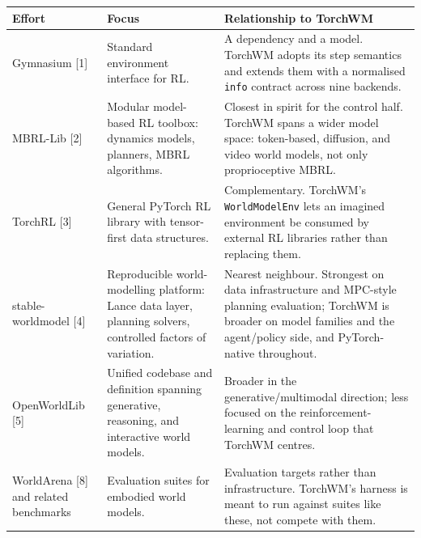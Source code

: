 \documentclass[10pt,a4paper]{article}
\begin{document}
{\footnotesize
\begin{tabular}{@{}p{}p{}p{}@{}}
\toprule
\textbf{Effort} & \textbf{Focus} & \textbf{Relationship to TorchWM}\\
\midrule
Gymnasium [1] & Standard environment interface for RL. & A dependency and a model. TorchWM adopts its step semantics and extends them with a normalised \texttt{info} contract across nine backends.\\[1.4mm]
MBRL-Lib [2] & Modular model-based RL toolbox: dynamics models, planners, MBRL algorithms. & Closest in spirit for the control half. TorchWM spans a wider model space: token-based, diffusion, and video world models, not only proprioceptive MBRL.\\[1.4mm]
TorchRL [3] & General PyTorch RL library with tensor-first data structures. & Complementary. TorchWM's \texttt{WorldModelEnv} lets an imagined environment be consumed by external RL libraries rather than replacing them.\\[1.4mm]
stable-worldmodel [4] & Reproducible world-modelling platform: Lance data layer, planning solvers, controlled factors of variation. & Nearest neighbour. Strongest on data infrastructure and MPC-style planning evaluation; TorchWM is broader on model families and the agent/policy side, and PyTorch-native throughout.\\[1.4mm]
OpenWorldLib [5] & Unified codebase and definition spanning generative, reasoning, and interactive world models. & Broader in the generative/multimodal direction; less focused on the reinforcement-learning and control loop that TorchWM centres.\\[1.4mm]
WorldArena [8] and related benchmarks & Evaluation suites for embodied world models. & Evaluation targets rather than infrastructure. TorchWM's harness is meant to run against suites like these, not compete with them.\\
\bottomrule
\end{tabular}}
\end{document}
